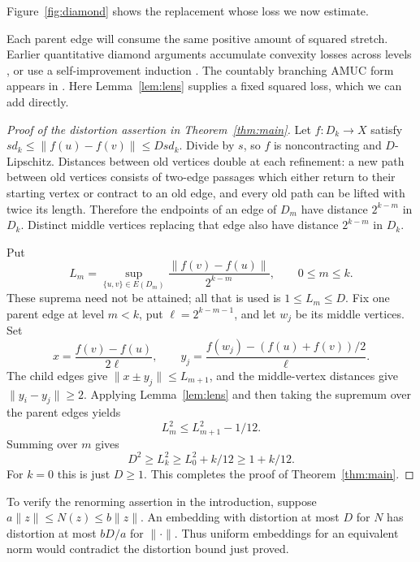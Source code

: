 Figure~\ref{fig:diamond} shows the replacement whose loss we now estimate.


Each parent edge will consume the same positive amount of squared
stretch. Earlier quantitative diamond arguments accumulate convexity
losses across levels \cite[Lemma~2.2]{LeeNaor2004}, or use a
self-improvement induction \cite[Lemma~1 and Proposition~2]{JohnsonSchechtman2009}.
The countably branching AMUC form appears in
\cite[Section~4]{BaudierEtAl2017}. Here Lemma~\ref{lem:lens} supplies
a fixed squared loss, which we can add directly.

\begin{proof}[Proof of the distortion assertion in Theorem~\ref{thm:main}]

Let $f:D_k\to X$ satisfy $s d_k\le\|f(u)-f(v)\|\le Ds d_k$.
Divide by $s$, so $f$ is noncontracting and $D$-Lipschitz. Distances
between old vertices double at each refinement: a new path between
old vertices consists of two-edge passages which either return to
their starting vertex or contract to an old edge, and every old path
can be lifted with twice its length. Therefore the endpoints of an
edge of $D_m$ have distance $2^{k-m}$ in $D_k$. Distinct middle
vertices replacing that edge also have distance $2^{k-m}$ in $D_k$.

Put
\[
 L_m=\sup_{\{u,v\}\in E(D_m)}
       \frac{\|f(v)-f(u)\|}{2^{k-m}},\qquad 0\le m\le k.
\]
These suprema need not be attained; all that is used is
$1\le L_m\le D$. Fix one parent edge at level $m<k$, put
$\ell=2^{k-m-1}$, and let $w_j$ be its middle vertices. Set
\[
 x=\frac{f(v)-f(u)}{2\ell},\qquad
 y_j=\frac{f(w_j)-(f(u)+f(v))/2}{\ell}.
\]
The child edges give $\|x\pm y_j\|\le L_{m+1}$, and the
middle-vertex distances give $\|y_i-y_j\|\ge2$. Applying Lemma~\ref{lem:lens}
and then taking the supremum over the parent edges yields
\[
 L_m^2\le L_{m+1}^2-1/12.
\]
Summing over $m$ gives
\[
 D^2\ge L_k^2\ge L_0^2+k/12\ge1+k/12.
\]
For $k=0$ this is just $D\ge1$. This completes the proof of
Theorem~\ref{thm:main}.
\end{proof}

To verify the renorming assertion in the introduction, suppose
$a\|z\|\le N(z)\le b\|z\|$. An embedding with distortion at
most $D$ for $N$ has distortion at most $bD/a$ for $\|\cdot\|$.
Thus uniform embeddings for an equivalent norm would contradict the
distortion bound just proved.

